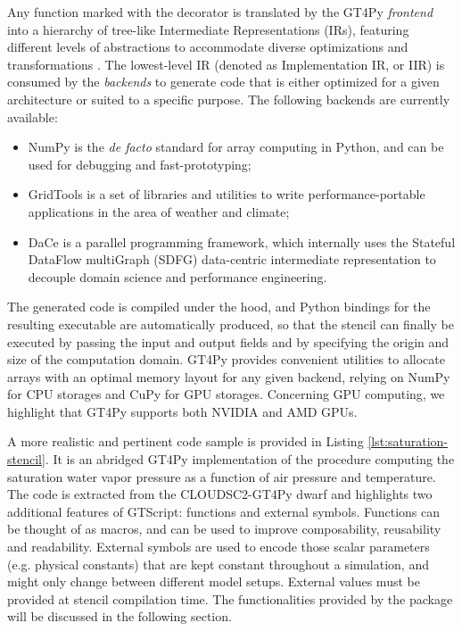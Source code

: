 \documentclass[gmd,manuscript,online]{copernicus}
\theoremstyle{theorem}
\theoremstyle{definition}
\theoremstyle{remark}
\theoremstyle{proposition}
\begin{document}
	Any function marked with the  decorator is translated by the GT4Py \emph{frontend} into a hierarchy of tree-like Intermediate Representations (IRs), featuring different levels of abstractions to accommodate diverse optimizations and transformations \citep{gysi21}. The lowest-level IR (denoted as Implementation IR, or IIR) is consumed by the \emph{backends} to generate code that is either optimized for a given architecture or suited to a specific purpose. The following backends are currently available:
	\begin{itemize}
		\item NumPy \citep{harris20} is the \emph{de facto} standard for array computing in Python, and can be used for debugging and fast-prototyping;
		\item GridTools \citep{afanasyev21} is a set of libraries and utilities to write performance-portable applications in the area of weather and climate;
		\item DaCe \citep{ben-nun19} is a parallel programming framework, which internally uses the Stateful DataFlow multiGraph (SDFG) data-centric intermediate representation to decouple domain science and performance engineering.
	\end{itemize}
	The generated code is compiled under the hood, and Python bindings for the resulting executable are automatically produced, so that the stencil can finally be executed by passing the input and output fields and by specifying the origin and size of the computation domain. GT4Py provides convenient utilities to allocate arrays with an optimal memory layout for any given backend, relying on NumPy for CPU storages and CuPy \citep{nishino17} for GPU storages. Concerning GPU computing, we highlight that GT4Py supports both NVIDIA and AMD GPUs.

	A more realistic and pertinent code sample is provided in Listing \ref{lst:saturation-stencil}. It is an abridged GT4Py implementation of the procedure computing the saturation water vapor pressure as a function of air pressure and temperature. The code is extracted from the CLOUDSC2-GT4Py dwarf and highlights two additional features of GTScript: functions and external symbols. Functions can be thought of as macros, and can be used to improve composability, reusability and readability. External symbols are used to encode those scalar parameters (e.g. physical constants) that are kept constant throughout a simulation, and might only change between different model setups. External values must be provided at stencil compilation time. The functionalities provided by the package  will be discussed in the following section.
\end{document}
